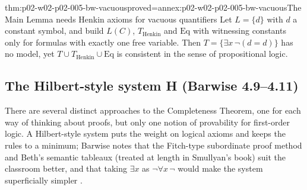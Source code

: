 \begin{hbtheorem}{thm:p02-w02-p02-005-bw-vacuous}{proved=annex:p02-w02-p02-005-bw-vacuous}{The Main Lemma needs Henkin axioms for vacuous quantifiers}
Let \(L=\{d\}\) with \(d\) a constant symbol, and build \(L(C)\),
\(T_{\mathrm{Henkin}}\) and \(\mathrm{Eq}\) with witnessing constants only
for formulas with exactly one free variable.  Then
\(T=\{\exists x\,\neg(d=d)\}\) has no model, yet
\(T\cup T_{\mathrm{Henkin}}\cup\mathrm{Eq}\) is consistent in the sense of
propositional logic.
\end{hbtheorem}

\subsection{The Hilbert-style system H (Barwise 4.9--4.11)}
\label{sec:p02-w02-p02-005-bw-hilbert}

There are several distinct approaches to the Completeness Theorem, one for
each way of thinking about proofs, but only one notion of provability for
first-order logic.  A Hilbert-style system puts the weight on logical
axioms and keeps the rules to a minimum; Barwise notes that the Fitch-type
subordinate proof method and Beth's semantic tableaux (treated at length
in Smullyan's book) suit the classroom better, and that taking
\(\exists x\) as \(\neg\forall x\,\neg\) would make the system superficially
simpler \cite[ch.~A.1, \S4, p.~34]{Barwise1977FirstOrder}.

